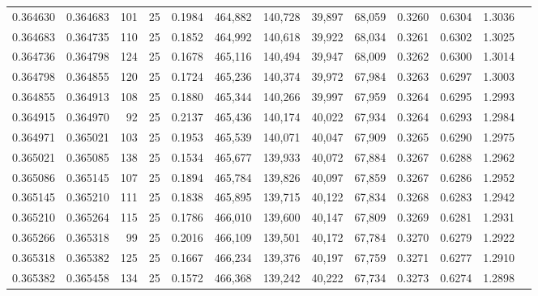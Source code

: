 \begin{tabular}{rrrrrrrrrrrrr}
0.364630 & 0.364683 &   101 &  25 &                                     0.1984 & 464,882 & 140,728 &  39,897 &  68,059 & 0.3260 & 0.6304 & 1.3036 \\
0.364683 & 0.364735 &   110 &  25 &                                     0.1852 & 464,992 & 140,618 &  39,922 &  68,034 & 0.3261 & 0.6302 & 1.3025 \\
0.364736 & 0.364798 &   124 &  25 &                                     0.1678 & 465,116 & 140,494 &  39,947 &  68,009 & 0.3262 & 0.6300 & 1.3014 \\
0.364798 & 0.364855 &   120 &  25 &                                     0.1724 & 465,236 & 140,374 &  39,972 &  67,984 & 0.3263 & 0.6297 & 1.3003 \\
0.364855 & 0.364913 &   108 &  25 &                                     0.1880 & 465,344 & 140,266 &  39,997 &  67,959 & 0.3264 & 0.6295 & 1.2993 \\
0.364915 & 0.364970 &    92 &  25 &                                     0.2137 & 465,436 & 140,174 &  40,022 &  67,934 & 0.3264 & 0.6293 & 1.2984 \\
0.364971 & 0.365021 &   103 &  25 &                                     0.1953 & 465,539 & 140,071 &  40,047 &  67,909 & 0.3265 & 0.6290 & 1.2975 \\
0.365021 & 0.365085 &   138 &  25 &                                     0.1534 & 465,677 & 139,933 &  40,072 &  67,884 & 0.3267 & 0.6288 & 1.2962 \\
0.365086 & 0.365145 &   107 &  25 &                                     0.1894 & 465,784 & 139,826 &  40,097 &  67,859 & 0.3267 & 0.6286 & 1.2952 \\
0.365145 & 0.365210 &   111 &  25 &                                     0.1838 & 465,895 & 139,715 &  40,122 &  67,834 & 0.3268 & 0.6283 & 1.2942 \\
0.365210 & 0.365264 &   115 &  25 &                                     0.1786 & 466,010 & 139,600 &  40,147 &  67,809 & 0.3269 & 0.6281 & 1.2931 \\
0.365266 & 0.365318 &    99 &  25 &                                     0.2016 & 466,109 & 139,501 &  40,172 &  67,784 & 0.3270 & 0.6279 & 1.2922 \\
0.365318 & 0.365382 &   125 &  25 &                                     0.1667 & 466,234 & 139,376 &  40,197 &  67,759 & 0.3271 & 0.6277 & 1.2910 \\
0.365382 & 0.365458 &   134 &  25 &                                     0.1572 & 466,368 & 139,242 &  40,222 &  67,734 & 0.3273 & 0.6274 & 1.2898 \\

\end{tabular}
